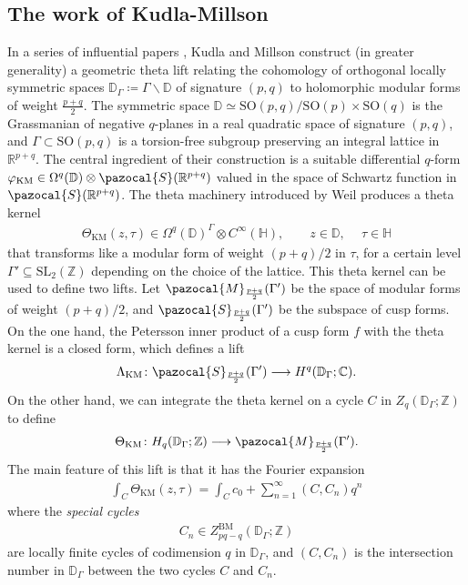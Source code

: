 \documentclass[a4paper,11pt]{amsart} %
\newcommand{\8}{\infty}
\newcommand{\Z}{\mathbb{Z}}
\newcommand{\SO}{\mathrm{SO}}
\newcommand{\SL}{\mathrm{SL}}
\newcommand{\KM}{\mathrm{KM}}
\newcommand{\BM}{\mathrm{BM}}
\newcommand{\D}{\mathbb{D}}
\newcommand{\HH}{\mathbb{H}}
\newcommand{\R}{\mathbb{R}}
\newcommand{\C}{\mathbb{C}}
\newcommand{\Scal}{\pazocal{S}}
\newcommand{\Mcal}{\pazocal{M}}
\theoremstyle{mytheoremstyle}
\theoremstyle{remark}
\numberwithin{equation}{section}
\begin{document}
\subsection{The work of Kudla-Millson} \label{intro: kudla millson} In a series of influential papers \cite{km2,km3,kmihes}, Kudla and Millson construct (in greater generality) a geometric theta lift relating the cohomology of orthogonal locally symmetric spaces $\D_\Gamma \coloneqq \Gamma \backslash \D$ of signature $(p,q)$ to holomorphic modular forms of weight $\frac{p+q}{2}$. The symmetric space $\D \simeq \SO(p,q)/\SO(p)\times \SO(q)$ is the Grassmanian of negative $q$-planes in a real quadratic space of signature $(p,q)$, and $\Gamma \subset \SO(p,q)$ is a torsion-free subgroup preserving an integral lattice in $\R^{p+q}$.
 The central ingredient of their construction is a suitable differential $q$-form $\varphi_{\KM} \in \Omega^q(\D) \otimes \Scal(\R^{p+q})$ valued in the space of Schwartz function in $\Scal(\R^{p+q})$. The theta machinery introduced by Weil \cite{weil} produces a theta kernel
\begin{align}
\Theta_{\KM}(z,\tau) \in \Omega^q(\D)^\Gamma \otimes C^\8(\HH), \qquad z \in \D, \ \quad \tau \in \HH
\end{align}
that transforms like a modular form of weight $(p+q)/2$ in $\tau$, for a certain level $\Gamma'\subseteq \SL_2(\Z)$ depending on the choice of the lattice. This theta kernel can be used to define two lifts. Let $\Mcal_{\frac{p+q}{2}}(\Gamma')$ be the space of modular forms of weight $(p+q)/2$, and $\Scal_{\frac{p+q}{2}}(\Gamma')$ be the subspace of cusp forms. On the one hand, the Petersson inner product of a cusp form $f$ with the theta kernel is a closed form, which defines a lift
\begin{align}
\Lambda_{\KM} \colon \Scal_{\frac{p+q}{2}}(\Gamma') \longrightarrow H^q(\D_\Gamma;\C).
\end{align} On the other hand, we can integrate the theta kernel on a cycle $C$ in $Z_q(\D_\Gamma;\Z)$ to define
\begin{align} \label{KMlift intro}
\Theta_{\KM} \colon H_q(\D_\Gamma;\Z) \longrightarrow \Mcal_{\frac{p+q}{2}}(\Gamma').
\end{align}
The main feature of this lift is that it has the Fourier expansion
\begin{align}
\int_{C} \Theta_{\KM}(z,\tau) = \int_Cc_0+ \sum_{n=1}^\8 (C,C_n)q^n
\end{align}
where the {\em special cycles}
\begin{align}
C_n \in Z^{\BM}_{pq-q}(\D_\Gamma;\Z)
\end{align} are locally finite cycles of codimension $q$ in $\D_{\Gamma}$, and $(C,C_n)$
is the intersection number in $\D_\Gamma$ between the two cycles $C$ and $C_n$.
\end{document}
